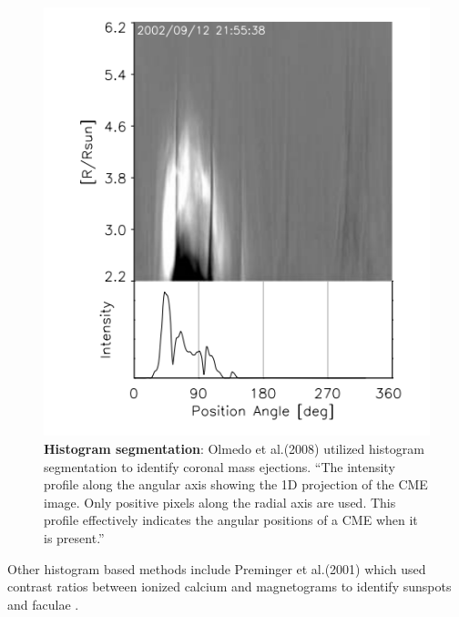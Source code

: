 \documentclass[twoside]{report}
\begin{document}
\begin{figure}[ht]
  \begin{center}
    \includegraphics[scale=1]{olmedo.png}
    \caption{{\bf Histogram segmentation}: Olmedo et al.(2008) utilized histogram segmentation to identify coronal mass ejections. ``The intensity profile along the angular axis showing the 1D projection of the CME image. Only positive pixels along the radial axis are used. This profile effectively indicates the angular positions of a CME when it is present.'' \cite{olmedo2008automatic}}
    \label{fig:olmedo}
 \end{center}
\end{figure}

Other histogram based methods include Preminger et al.(2001) which used contrast ratios between ionized calcium and magnetograms to identify sunspots and faculae \cite{preminger}.
\end{document}
